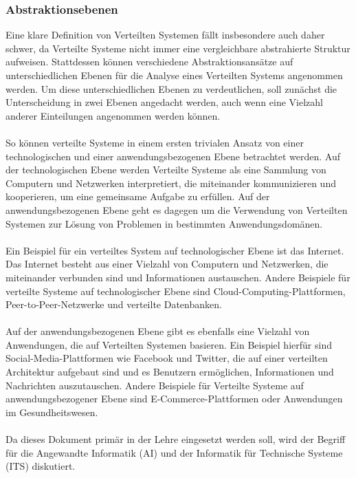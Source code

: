 \documentclass[../vs-script-first-v01.tex]{subfiles}
\begin{document}
\subsubsection{Abstraktionsebenen}
Eine klare Definition von Verteilten Systemen fällt insbesondere auch daher schwer, da Verteilte Systeme nicht immer eine vergleichbare abstrahierte Struktur aufweisen. Stattdessen können verschiedene Abstraktionsansätze auf unterschiedlichen Ebenen für die Analyse eines Verteilten Systems angenommen werden. Um diese unterschiedlichen Ebenen zu verdeutlichen, soll zunächst die Unterscheidung in zwei Ebenen angedacht werden, auch wenn eine Vielzahl anderer Einteilungen angenommen werden können. 
\\\\
So können verteilte Systeme in einem ersten trivialen Ansatz von einer technologischen und einer anwendungsbezogenen Ebene betrachtet werden\cite{coulouris2012distributed}. Auf der technologischen Ebene werden Verteilte Systeme als eine Sammlung von Computern und Netzwerken interpretiert, die miteinander kommunizieren und kooperieren, um eine gemeinsame Aufgabe zu erfüllen. Auf der anwendungsbezogenen Ebene geht es dagegen um die Verwendung von Verteilten Systemen zur Lösung von Problemen in bestimmten Anwendungsdomänen.
\\\\
Ein Beispiel für ein verteiltes System auf technologischer Ebene ist das Internet. Das Internet besteht aus einer Vielzahl von Computern und Netzwerken, die miteinander verbunden sind und Informationen austauschen. Andere Beispiele für verteilte Systeme auf technologischer Ebene sind Cloud-Computing-Plattformen, Peer-to-Peer-Netzwerke und verteilte Datenbanken.
\\\\
Auf der anwendungsbezogenen Ebene gibt es ebenfalls eine Vielzahl von Anwendungen, die auf Verteilten Systemen basieren. Ein Beispiel hierfür sind Social-Media-Plattformen wie Facebook und Twitter, die auf einer verteilten Architektur aufgebaut sind und es Benutzern ermöglichen, Informationen und Nachrichten auszutauschen. Andere Beispiele für Verteilte Systeme auf anwendungsbezogener Ebene sind E-Commerce-Plattformen oder Anwendungen im Gesundheitswesen.
\\\\
Da dieses Dokument primär in der Lehre eingesetzt werden soll, wird der Begriff für die Angewandte Informatik (AI) und der Informatik für Technische Systeme (ITS) diskutiert. 
\end{document}
